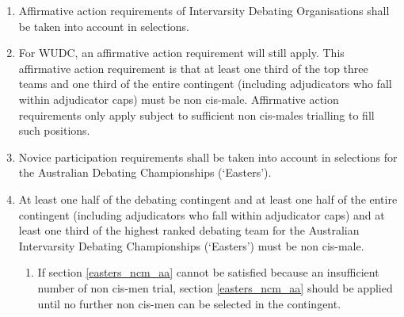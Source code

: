 \begin{enumerate}
\item Affirmative action requirements of Intervarsity Debating Organisations shall be taken into account in selections.

\item For WUDC, an affirmative action requirement will still apply. This affirmative action requirement is that at least one third of the top three teams and one third of the entire contingent (including adjudicators who fall within adjudicator caps) must be non cis-male. Affirmative action requirements only apply subject to sufficient non cis-males trialling to fill such positions.

\item Novice participation requirements shall be taken into account in selections for the Australian Debating Championships (‘Easters’).

\item At least one half of the debating contingent and at least one half of the entire contingent (including adjudicators who fall within adjudicator caps) and at least one third of the highest ranked debating team for the Australian Intervarsity Debating Championships (‘Easters’) must be non cis-male. \label{easters_ncm_aa}
  \begin{enumerate}
  \item If section \ref{easters_ncm_aa} cannot be satisfied because an insufficient number of non cis-men trial, section \ref{easters_ncm_aa} should be applied until no further non cis-men can be selected in the contingent.
  \end{enumerate}
\end{enumerate}
